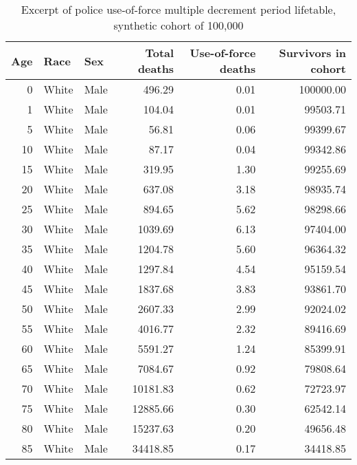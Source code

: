 \begin{table}[ht]
\centering
\begin{tabular}{rllrrr}
  \hline
Age & Race & Sex & Total deaths & Use-of-force deaths & Survivors in cohort \\ 
  \hline
  0 & White & Male & 496.29 & 0.01 & 100000.00 \\ 
    1 & White & Male & 104.04 & 0.01 & 99503.71 \\ 
    5 & White & Male & 56.81 & 0.06 & 99399.67 \\ 
   10 & White & Male & 87.17 & 0.04 & 99342.86 \\ 
   15 & White & Male & 319.95 & 1.30 & 99255.69 \\ 
   20 & White & Male & 637.08 & 3.18 & 98935.74 \\ 
   25 & White & Male & 894.65 & 5.62 & 98298.66 \\ 
   30 & White & Male & 1039.69 & 6.13 & 97404.00 \\ 
   35 & White & Male & 1204.78 & 5.60 & 96364.32 \\ 
   40 & White & Male & 1297.84 & 4.54 & 95159.54 \\ 
   45 & White & Male & 1837.68 & 3.83 & 93861.70 \\ 
   50 & White & Male & 2607.33 & 2.99 & 92024.02 \\ 
   55 & White & Male & 4016.77 & 2.32 & 89416.69 \\ 
   60 & White & Male & 5591.27 & 1.24 & 85399.91 \\ 
   65 & White & Male & 7084.67 & 0.92 & 79808.64 \\ 
   70 & White & Male & 10181.83 & 0.62 & 72723.97 \\ 
   75 & White & Male & 12885.66 & 0.30 & 62542.14 \\ 
   80 & White & Male & 15237.63 & 0.20 & 49656.48 \\ 
   85 & White & Male & 34418.85 & 0.17 & 34418.85 \\ 
   \hline
\end{tabular}
\caption{Excerpt of police use-of-force 
                   multiple decrement period lifetable, 
                   synthetic cohort of 100,000} 
\label{tab:life_samp}
\end{table}
